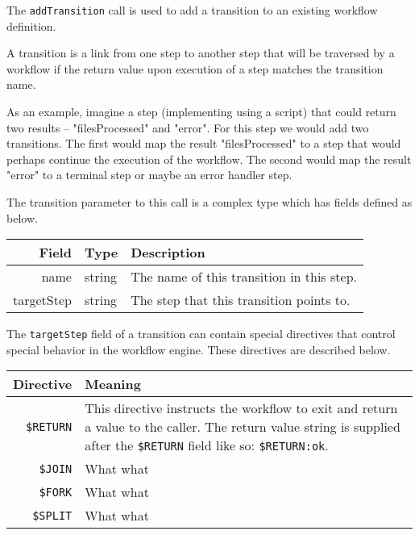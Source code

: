 The \verb+addTransition+ call is used to add a transition to an existing workflow definition.

A transition is a link from one step to another step that will be traversed by a workflow if
the return value upon execution of a step matches the transition name.

As an example, imagine a step (implementing using a \Reflex script) that could return two results --
"filesProcessed" and "error". For this step we would add two transitions. The first would map the result
"filesProcessed" to a step that would perhaps continue the execution of the workflow. The second would map the
result "error" to a terminal step or maybe an error handler step.

The transition parameter to this call is a complex type which has fields defined as below.

\begin{table}[h]
  \small
\begin{center}
\begin{tabular}{r l p{8cm}}
  Field & Type & Description \\
  \hline
  name & string & The name of this transition in this step.\\
  targetStep & string & The step that this transition points to.\\
\end{tabular}
\end{center}
\end{table}

The \verb+targetStep+ field of a transition can contain special directives that control
special behavior in the workflow engine. These directives are described below.

\begin{table}[h]
  \small
\begin{center}
\begin{tabular}{r p{8cm}}
  Directive & Meaning \\
  \hline
  \verb+$RETURN+ & This directive instructs the workflow to exit and return a value to
     the caller. The return value string is supplied after the \verb+$RETURN+ field like so:
     \verb+$RETURN:ok+. \\
  \verb+$JOIN+ & What what \\
  \verb+$FORK+ & What what \\
  \verb+$SPLIT+ & What what \\

\end{tabular}
\end{center}
\end{table}
